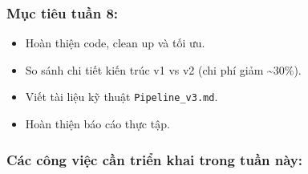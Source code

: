 \hypertarget{mux1ee5c-tiuxeau-tuux1ea7n-8}{%
\subsubsection{Mục tiêu tuần 8:}}

\begin{itemize}
\tightlist
\item
  Hoàn thiện code, clean up và tối ưu.
\item
  So sánh chi tiết kiến trúc v1 vs v2 (chi phí giảm
  \textasciitilde30\%).
\item
  Viết tài liệu kỹ thuật \texttt{Pipeline\_v3.md}.
\item
  Hoàn thiện báo cáo thực tập.
\end{itemize}

\hypertarget{cuxe1c-cuxf4ng-viux1ec7c-cux1ea7n-triux1ec3n-khai-trong-tuux1ea7n-nuxe0y}{%
\subsubsection{Các công việc cần triển khai trong tuần
này:}}

